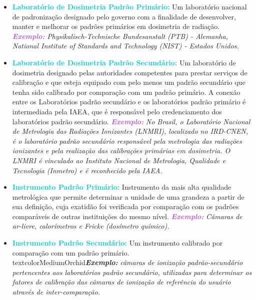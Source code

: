 \documentclass[11pt,a4paper]{article}
\begin{document}
  		\begin{itemize}

			\item \textcolor{DarkTurquoise}{\textbf{Laboratório de Dosimetria Padrão Primário:}} Um laboratório nacional de padronização designado pelo governo com a finalidade de desenvolver, manter e melhorar os padrões primários em dosimetria de radiação. \textcolor{MediumOrchid}{\textit{\textbf{Exemplo:}}} \textit{Physikalisch-Technische Bundesanstalt (PTB) - Alemanha, National Institute of Standards and Technology (NIST) - Estados Unidos. }
			
			\item \textcolor{DarkTurquoise}{\textbf{Laboratório de Dosimetria Padrão Secundário:}} Um laboratório de dosimetria designado pelas autoridades competentes para prestar serviços de calibração e que esteja equipado com pelo menos um padrão secundário que tenha sido calibrado por comparação com um padrão primário. A conexão entre os Laboratórios padrão secundário e os laboratórios padrão primário é intermediada pela IAEA, que é responsável pelo credenciamento dos laboratórios padrão secundário. \textcolor{MediumOrchid}{\textit{\textbf{Exemplo:}}}\textit{ No Brasil, o Laboratório Nacional de Metrologia das Radiações Ionizantes (LNMRI), localizado no IRD-CNEN, é o laboratório padrão secundário responsável pela metrologia das radiações ionizantes e pela realização das calibrações primárias em dosimetria. O LNMRI  é vinculado ao Instituto Nacional de Metrologia, Qualidade e Tecnologia (Inmetro) e é reconhecido pela IAEA.}

			\item \textcolor{DarkTurquoise}{\textbf{Instrumento Padrão Primário:}} Instrumento da mais alta qualidade metrológica que permite determinar a unidade de uma grandeza a partir de sua definição, cuja exatidão foi verificada por comparação com os padrões comparáveis de outras instituições do mesmo nível. \textcolor{MediumOrchid}{\textit{\textbf{Exemplo:}}} \textit{Câmaras de ar-livre, calorímetros e Fricke (dosímetro químico).}
			
			\item \textcolor{DarkTurquoise}{\textbf{Instrumento Padrão Secundário:}} Um instrumento calibrado por comparação com um padrão primário. \\textcolor{MediumOrchid}{\textit{\textbf{Exemplo:}}} \textit{câmaras de ionização padrão-secundário pertencentes aos laboratórios padrão secundário, utilizadas para determinar os fatores de calibração das câmaras de ionização de referência do usuário através de inter-comparação.}
			

\end{itemize}
\end{document}
